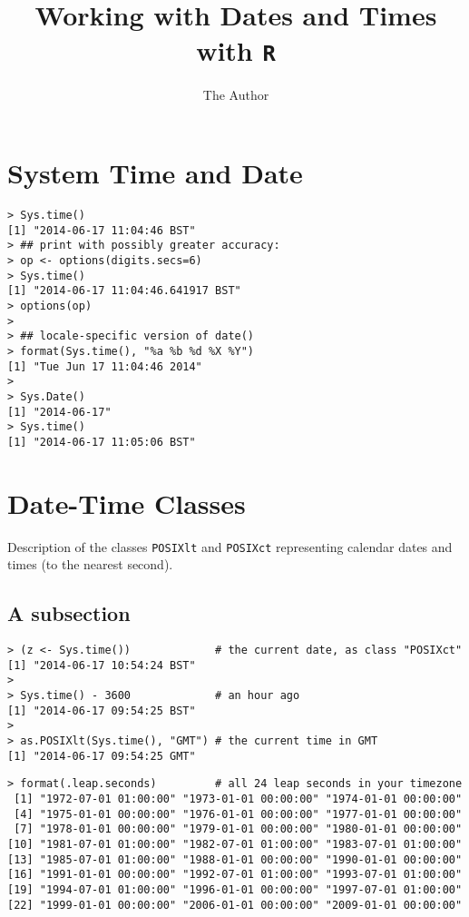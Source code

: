 \documentclass[11pt]{article} %
\title{Working with Dates and Times with \texttt{R}}
\author{The Author}
\begin{document}
\maketitle


\section{System Time and Date}

\begin{framed}
\begin{verbatim}
> Sys.time()
[1] "2014-06-17 11:04:46 BST"
> ## print with possibly greater accuracy:
> op <- options(digits.secs=6)
> Sys.time()
[1] "2014-06-17 11:04:46.641917 BST"
> options(op)
> 
> ## locale-specific version of date()
> format(Sys.time(), "%a %b %d %X %Y")
[1] "Tue Jun 17 11:04:46 2014"
> 
> Sys.Date()
[1] "2014-06-17"
> Sys.time()
[1] "2014-06-17 11:05:06 BST"
\end{verbatim}
\end{framed}
\newpage
\section{Date-Time Classes}


Description of the classes \texttt{POSIXlt} and \texttt{POSIXct} representing calendar dates and times (to the nearest second).

\subsection{A subsection}

\begin{framed}
\begin{verbatim}
> (z <- Sys.time())             # the current date, as class "POSIXct"
[1] "2014-06-17 10:54:24 BST"
> 
> Sys.time() - 3600             # an hour ago
[1] "2014-06-17 09:54:25 BST"
> 
> as.POSIXlt(Sys.time(), "GMT") # the current time in GMT
[1] "2014-06-17 09:54:25 GMT"
\end{verbatim}
\end{framed}
\newpage
\begin{framed}
\begin{verbatim}
> format(.leap.seconds)         # all 24 leap seconds in your timezone
 [1] "1972-07-01 01:00:00" "1973-01-01 00:00:00" "1974-01-01 00:00:00"
 [4] "1975-01-01 00:00:00" "1976-01-01 00:00:00" "1977-01-01 00:00:00"
 [7] "1978-01-01 00:00:00" "1979-01-01 00:00:00" "1980-01-01 00:00:00"
[10] "1981-07-01 01:00:00" "1982-07-01 01:00:00" "1983-07-01 01:00:00"
[13] "1985-07-01 01:00:00" "1988-01-01 00:00:00" "1990-01-01 00:00:00"
[16] "1991-01-01 00:00:00" "1992-07-01 01:00:00" "1993-07-01 01:00:00"
[19] "1994-07-01 01:00:00" "1996-01-01 00:00:00" "1997-07-01 01:00:00"
[22] "1999-01-01 00:00:00" "2006-01-01 00:00:00" "2009-01-01 00:00:00"
\end{verbatim}
\end{framed}
\end{document}
